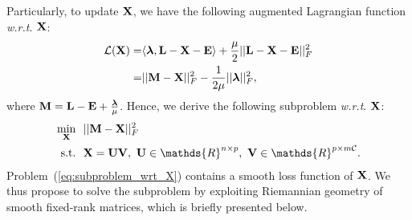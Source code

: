 \documentclass[letterpaper]{article}
\def\bM{{\bf M}}
\def\bE{{\bf E}}
\def\blambda{{\bm \lambda}}
\def\calL{{\mathcal{L}}}
\def\calC{{\mathcal{C}}}
\def\bL{{\bf L}}
\def\bU{{\bf U}}
\def\bV{{\bf V}}
\def\dsR{\mathds{R}}
\def\bX{{\bf X}}
\def\bX{{\bf X}}
\def\st{{\text{s.t.}}}
\def\wrt{\emph{w.r.t}}
\begin{document}
Particularly, to update $\bX$, we have the following augmented Lagrangian function \wrt. $\bX$:
{\small
\begin{align}\label{eq:langrangian_wrt_X}
  \calL (\bX) = & \langle \blambda, \bL - \bX - \bE \rangle + \frac{\mu}{2} || \bL - \bX - \bE ||_F^2  \nonumber  \\
              = & || \bM - \bX ||_F^2 - \frac{1}{2\mu}|| \blambda ||_F^2   ,
\end{align}
}
\noindent
where $\bM = \bL - \bE + \frac{\blambda}{\mu}$.
Hence, we derive the following subproblem \wrt. $\bX$:
{\small
\begin{align}\label{eq:subproblem_wrt_X}
  \min_{\bX} ~&~ || \bM - \bX ||_F^2    \nonumber \\
  \st        ~&~ \bX = \bU \bV,~\bU \in \dsR^{n \times p},~\bV \in \dsR^{p \times m\calC}   .
\end{align}
}
\noindent
Problem~(\ref{eq:subproblem_wrt_X}) contains a smooth loss function of $\bX$.
We thus propose to solve the subproblem by exploiting Riemannian geometry of smooth fixed-rank matrices, which is briefly presented below.
\end{document}
